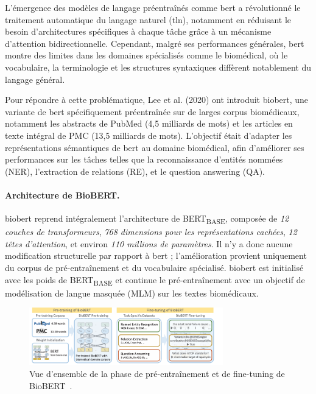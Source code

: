 \documentclass[12pt]{report}
\begin{document}
L’émergence des modèles de langage préentraînés comme \gls{bert} a révolutionné le traitement automatique du langage naturel (\gls{tln}), notamment en réduisant le besoin d’architectures spécifiques à chaque tâche grâce à un mécanisme d'attention bidirectionnelle. Cependant, malgré ses performances générales, \gls{bert} montre des limites dans les domaines spécialisés comme le biomédical, où le vocabulaire, la terminologie et les structures syntaxiques diffèrent notablement du langage général.

Pour répondre à cette problématique, Lee et al. (2020) ont introduit \gls{biobert}, une variante de \gls{bert} spécifiquement préentraînée sur de larges corpus biomédicaux, notamment les abstracts de PubMed (4,5 milliards de mots) et les articles en texte intégral de PMC (13,5 milliards de mots). L’objectif était d’adapter les représentations sémantiques de \gls{bert} au domaine biomédical, afin d'améliorer ses performances sur les tâches telles que la reconnaissance d’entités nommées (NER), l’extraction de relations (RE), et le question answering (QA).

\paragraph{Architecture de BioBERT.} \gls{biobert} reprend intégralement l'architecture de BERT\textsubscript{BASE}, composée de \textit{12 couches de transformeurs}, \textit{768 dimensions pour les représentations cachées}, \textit{12 têtes d’attention}, et environ \textit{110 millions de paramètres}. Il n’y a donc aucune modification structurelle par rapport à \gls{bert} ; l'amélioration provient uniquement du corpus de pré-entraînement et du vocabulaire spécialisé. \gls{biobert} est initialisé avec les poids de BERT\textsubscript{BASE} et continue le pré-entraînement avec un objectif de modélisation de langue masquée (MLM) sur les textes biomédicaux.

\begin{figure}[H]
    \centering
    \includegraphics[width=0.75\textwidth]{biobert.png}
    \caption{Vue d'ensemble de la phase de pré-entraînement et de fine-tuning de BioBERT~\cite{lee2020biobert}.}
    \label{fig:biobert_architecture}
\end{figure}
\end{document}
